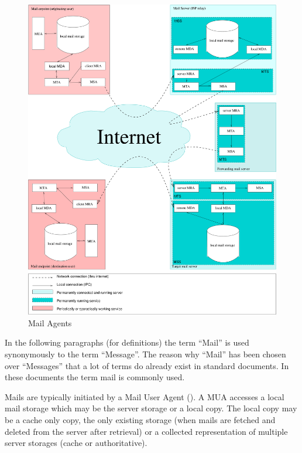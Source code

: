 \begin{figure}[ht!]
	\centering\includegraphics[width=\columnwidth]{inc/MailAgents1.pdf}
	\caption{Mail Agents}\label{fig:MailAgents}
\end{figure}

In the following paragraphs (for definitions) the term ``Mail'' is used synonymously to the term ``Message''. The reason why ``Mail'' has been chosen over ``Messages'' that a lot of terms do already exist in standard documents. In these documents the term mail is commonly used.\par

Mails are typically initiated by a Mail User Agent (). A MUA accesses a local mail storage which may be the server storage or a local copy. The local copy may be a cache only copy, the only existing storage (when mails are fetched and deleted from the server after retrieval) or a collected representation of multiple server storages (cache or authoritative).\par

